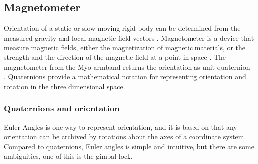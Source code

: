 \subsection{Magnetometer}
Orientation of a static or slow-moving rigid body can be determined from the measured gravity and local magnetic field vectors \cite{yun2008simplified}. Magnetometer is a device that measure magnetic fields, either the magnetization of magnetic materials, or the strength and the direction of the magnetic field at a point in space \cite{magnetometer_wiki}. The magnetometer from the Myo armband returns the orientation as unit quaternion \cite{myoSDK}. Quaternions provide a mathematical notation for representing orientation and rotation in the three dimensional space.

\subsubsection{Quaternions and orientation}
 Euler Angles is one way to represent orientation, and it is based on that any orientation can be archived by rotations about the axes of a coordinate system. Compared to quaternions, Euler angles is simple and intuitive, but there are some ambiguities, one of this is the gimbal lock.